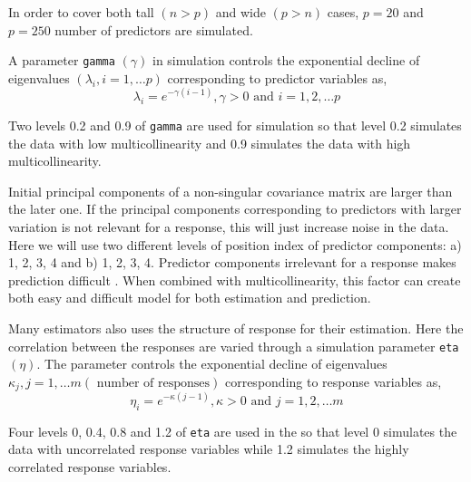 \documentclass[12pt,3p,authoryear]{elsarticle}
\providecommand{\tightlist}{%
  \setlength{\itemsep}{0pt}\setlength{\parskip}{0pt}}
\begin{document}
\begin{description}
\tightlist
\item[\textbf{Number of predictors:}]
In order to cover both tall \((n>p)\) and wide \((p>n)\) cases, \(p= 20\) and \(p= 250\) number of predictors are simulated.
\item[\textbf{Multicollinearity in predictor variables:}]
A parameter \texttt{gamma} \((\gamma)\) in simulation controls the exponential decline of eigenvalues \((\lambda_i, i = 1, \ldots p)\) corresponding to predictor variables as,
\begin{equation}
  \lambda_i = e^{-\gamma(i-1)}, \gamma > 0 \text{ and } i = 1, 2, \ldots p
  \label{eq:gamma}
  \end{equation}

Two levels 0.2 and 0.9 of \texttt{gamma} are used for simulation so that level 0.2 simulates the data with low multicollinearity and 0.9 simulates the data with high multicollinearity.
\item[\textbf{Position of relevant components:}]
Initial principal components of a non-singular covariance matrix are larger than the later one. If the principal components corresponding to predictors with larger variation is not relevant for a response, this will just increase noise in the data. Here we will use two different levels of position index of predictor components: a) 1, 2, 3, 4 and b) 1, 2, 3, 4. Predictor components irrelevant for a response makes prediction difficult \citep{Helland1994b}. When combined with multicollinearity, this factor can create both easy and difficult model for both estimation and prediction.
\item[\textbf{Correlation in response variables:}]
Many estimators also uses the structure of response for their estimation. Here the correlation between the responses are varied through a simulation parameter \texttt{eta} \((\eta)\). The parameter controls the exponential decline of eigenvalues \(\kappa_j, j = 1, \ldots m (\text{ number of responses})\) corresponding to response variables as,
\begin{equation}
\eta_i = e^{-\kappa(j-1)}, \kappa > 0 \text{ and } j = 1, 2, \ldots m
\label{eq:eta}
\end{equation}

Four levels 0, 0.4, 0.8 and 1.2 of \texttt{eta} are used in the so that level 0 simulates the data with uncorrelated response variables while 1.2 simulates the highly correlated response variables.
\end{description}
\end{document}
